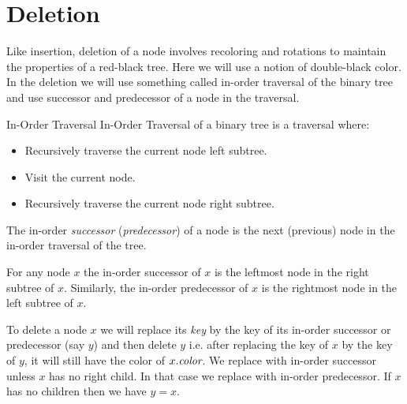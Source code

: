 \section{Deletion}
Like insertion, deletion of a node involves recoloring and rotations to maintain the properties of a red-black tree. Here we will use a notion of double-black color. In the deletion we will use something called in-order traversal of the binary tree and use successor and predecessor of a node in the traversal. \begin{Definition}{In-Order Traversal}{}
	In-Order Traversal of a binary tree is a traversal where:\begin{itemize}
		\item Recursively traverse the current node left subtree.
		\item Visit the current node.
		\item Recursively traverse the current node right subtree.
	\end{itemize}
	The in-order \emph{successor} (\emph{predecessor}) of a node is the next (previous) node in the in-order traversal of the tree.
\end{Definition}
\begin{observation}
	For any node $x$ the in-order successor of $x$ is the leftmost node in the right subtree of $x$. Similarly, the in-order predecessor of $x$ is the rightmost node in the left subtree of $x$.
\end{observation}
To delete a node $x$ we will replace its \emph{key} by the key of its in-order successor or predecessor (say $y$) and then delete $y$ i.e. after replacing the key of $x$ by the key of $y$, it will still have the color of $x.\emph{color}$. We replace with in-order successor unless $x$ has no right child. In that case we replace with in-order predecessor. If $x$ has no children then we have $y=x$.

